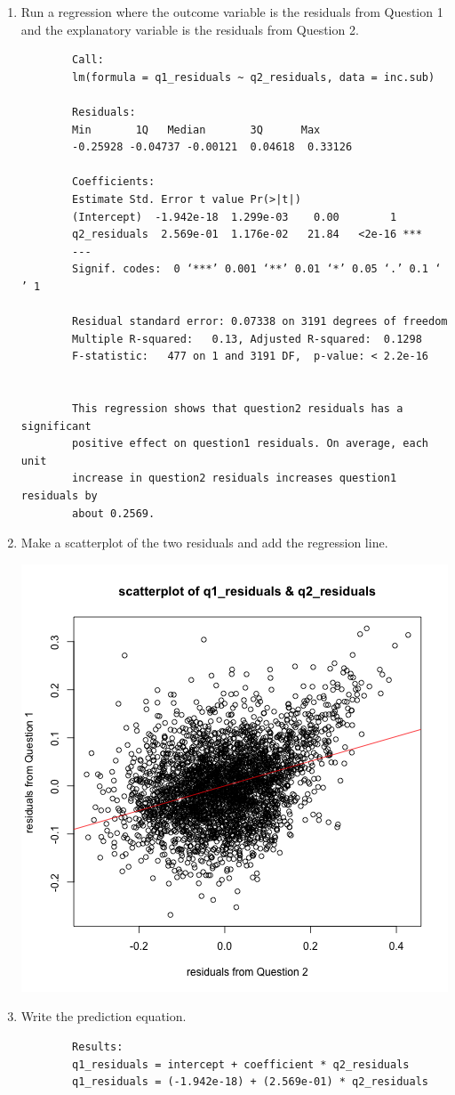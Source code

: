 \documentclass[12pt,letterpaper]{article}
\begin{document}
	\begin{enumerate}
		\item Run a regression where the outcome variable is the residuals from Question 1 and the explanatory variable is the residuals from Question 2.
		
		 
		
		\begin{verbatim} 
		Call:
		lm(formula = q1_residuals ~ q2_residuals, data = inc.sub)
		
		Residuals:
		Min       1Q   Median       3Q      Max 
		-0.25928 -0.04737 -0.00121  0.04618  0.33126 
		
		Coefficients:
		Estimate Std. Error t value Pr(>|t|)    
		(Intercept)  -1.942e-18  1.299e-03    0.00        1    
		q2_residuals  2.569e-01  1.176e-02   21.84   <2e-16 ***
		---
		Signif. codes:  0 ‘***’ 0.001 ‘**’ 0.01 ‘*’ 0.05 ‘.’ 0.1 ‘ ’ 1
		
		Residual standard error: 0.07338 on 3191 degrees of freedom
		Multiple R-squared:   0.13,	Adjusted R-squared:  0.1298 
		F-statistic:   477 on 1 and 3191 DF,  p-value: < 2.2e-16
		
		
		This regression shows that question2 residuals has a significant 
		positive effect on question1 residuals. On average, each unit 
		increase in question2 residuals increases question1 residuals by 
		about 0.2569.
		\end{verbatim}
		
		\item Make a scatterplot of the two residuals and add the regression line. 
		
		  
		\includegraphics[width=.75\textwidth]{q4_regression.png}
		
		\item Write the prediction equation.
		
		\begin{verbatim} 
		Results: 
		q1_residuals = intercept + coefficient * q2_residuals
		q1_residuals = (-1.942e-18) + (2.569e-01) * q2_residuals
		\end{verbatim}
		
	\end{enumerate}
	
\end{document}
